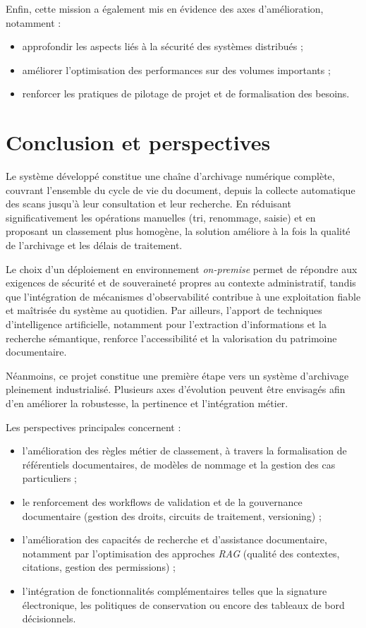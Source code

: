 \documentclass[12pt,a4paper]{report}
\begin{document}
Enfin, cette mission a également mis en évidence des axes d’amélioration, notamment :
\begin{itemize}
  \item approfondir les aspects liés à la sécurité des systèmes distribués ;
  \item améliorer l’optimisation des performances sur des volumes importants ;
  \item renforcer les pratiques de pilotage de projet et de formalisation des besoins.
\end{itemize}

\chapter*{Conclusion et perspectives}
Le système développé constitue une chaîne d’archivage numérique complète, couvrant l’ensemble du cycle de vie du document, depuis la collecte automatique des scans jusqu’à leur consultation et leur recherche. En réduisant significativement les opérations manuelles (tri, renommage, saisie) et en proposant un classement plus homogène, la solution améliore à la fois la qualité de l’archivage et les délais de traitement.

Le choix d’un déploiement en environnement \textit{on-premise} permet de répondre aux exigences de sécurité et de souveraineté propres au contexte administratif, tandis que l’intégration de mécanismes d’observabilité contribue à une exploitation fiable et maîtrisée du système au quotidien. Par ailleurs, l’apport de techniques d’intelligence artificielle, notamment pour l’extraction d’informations et la recherche sémantique, renforce l’accessibilité et la valorisation du patrimoine documentaire.

Néanmoins, ce projet constitue une première étape vers un système d’archivage pleinement industrialisé. Plusieurs axes d’évolution peuvent être envisagés afin d’en améliorer la robustesse, la pertinence et l’intégration métier.

Les perspectives principales concernent :
\begin{itemize}
  \item l’amélioration des règles métier de classement, à travers la formalisation de référentiels documentaires, de modèles de nommage et la gestion des cas particuliers ;
  \item le renforcement des workflows de validation et de la gouvernance documentaire (gestion des droits, circuits de traitement, versioning) ;
  \item l’amélioration des capacités de recherche et d’assistance documentaire, notamment par l’optimisation des approches \textit{RAG} (qualité des contextes, citations, gestion des permissions) ;
  \item l’intégration de fonctionnalités complémentaires telles que la signature électronique, les politiques de conservation ou encore des tableaux de bord décisionnels.
\end{itemize}
\end{document}

